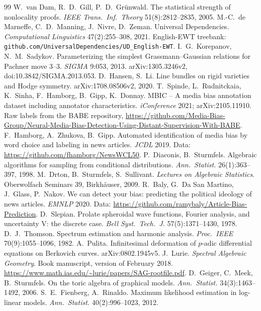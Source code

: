 \documentclass[11pt]{article}
\theoremstyle{definition}
\theoremstyle{remark}
\begin{document}
\begin{thebibliography}{99}
 W.~van Dam, R.~D.~Gill, P.~D.~Gr\"unwald. The statistical strength of nonlocality proofs. \emph{IEEE Trans.\ Inf.\ Theory} 51(8):2812--2835, 2005.
 M.-C.~de Marneffe, C.~D.~Manning, J.~Nivre, D.~Zeman. Universal Dependencies. \emph{Computational Linguistics} 47(2):255--308, 2021. English-EWT treebank: \texttt{github.com/UniversalDependencies/UD\_English-EWT}.
 I.~G.~Korepanov, N.~M.~Sadykov. Parameterizing the simplest Grassmann--Gaussian relations for Pachner move 3--3. \emph{SIGMA} 9:053, 2013. arXiv:1305.3246v2, doi:10.3842/SIGMA.2013.053.
 D.~Hansen, S.~Li. Line bundles on rigid varieties and Hodge symmetry. arXiv:1708.08506v2, 2020.
 T.~Spinde, L.~Rudnitckaia, K.~Sinha, F.~Hamborg, B.~Gipp, K.~Donnay. MBIC -- A media bias annotation dataset including annotator characteristics. \emph{iConference} 2021; arXiv:2105.11910. Raw labels from the BABE repository, \url{https://github.com/Media-Bias-Group/Neural-Media-Bias-Detection-Using-Distant-Supervision-With-BABE}.
 F.~Hamborg, A.~Zhukova, B.~Gipp. Automated identification of media bias by word choice and labeling in news articles. \emph{JCDL} 2019. Data: \url{https://github.com/fhamborg/NewsWCL50}.
 P.~Diaconis, B.~Sturmfels. Algebraic algorithms for sampling from conditional distributions. \emph{Ann.\ Statist.} 26(1):363--397, 1998.
 M.~Drton, B.~Sturmfels, S.~Sullivant. \emph{Lectures on Algebraic Statistics}. Oberwolfach Seminars 39, Birkh\"auser, 2009.
 R.~Baly, G.~Da San Martino, J.~Glass, P.~Nakov. We can detect your bias: predicting the political ideology of news articles. \emph{EMNLP} 2020. Data: \url{https://github.com/ramybaly/Article-Bias-Prediction}.
 D.~Slepian. Prolate spheroidal wave functions, Fourier analysis, and uncertainty V: the discrete case. \emph{Bell Syst.\ Tech.\ J.} 57(5):1371--1430, 1978.
 D.~J.~Thomson. Spectrum estimation and harmonic analysis. \emph{Proc.\ IEEE} 70(9):1055--1096, 1982.
 A.~Pulita. Infinitesimal deformation of $p$-adic differential equations on Berkovich curves. arXiv:0802.1945v5.
 J.~Lurie. \emph{Spectral Algebraic Geometry}. Book manuscript, version of February 2018. \url{https://www.math.ias.edu/~lurie/papers/SAG-rootfile.pdf}.
 D.~Geiger, C.~Meek, B.~Sturmfels. On the toric algebra of graphical models. \emph{Ann.\ Statist.} 34(3):1463--1492, 2006.
 S.~E.~Fienberg, A.~Rinaldo. Maximum likelihood estimation in log-linear models. \emph{Ann.\ Statist.} 40(2):996--1023, 2012.

\end{thebibliography}
\end{document}
